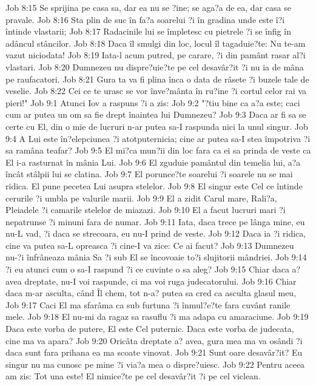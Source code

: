 Job 8:15  Se sprijina pe casa sa, dar ea nu se ?ine; se aga?a de ea, dar casa se pravale.
Job 8:16  Sta plin de suc în fa?a soarelui ?i în gradina unde este î?i întinde vlastarii;
Job 8:17  Radacinile lui se împletesc cu pietrele ?i se înfig în adâncul stâncilor.
Job 8:18  Daca îl smulgi din loc, locul îl tagaduie?te: Nu te-am vazut niciodata!
Job 8:19  Iata-l acum putred, pe carare, ?i din pamânt rasar al?i vlastari.
Job 8:20  Dumnezeu nu dispre?uie?te pe cel desavâr?it ?i nu ia de mâna pe raufacatori.
Job 8:21  Gura ta va fi plina înca o data de râsete ?i buzele tale de veselie.
Job 8:22  Cei ce te urasc se vor înve?mânta în ru?ine ?i cortul celor rai va pieri!"
Job 9:1  Atunci Iov a raspuns ?i a zis:
Job 9:2  "?tiu bine ca a?a este; caci cum ar putea un om sa fie drept înaintea lui Dumnezeu?
Job 9:3  Daca ar fi sa se certe cu El, din o mie de lucruri n-ar putea sa-I raspunda nici la unul singur.
Job 9:4  A Lui este în?elepciunea ?i atotputernicia; cine ar putea sa-I stea împotriva ?i sa ramâna teafar?
Job 9:5  El mi?ca mun?ii din loc fara ca ei sa prinda de veste ca El i-a rasturnat în mânia Lui.
Job 9:6  El zguduie pamântul din temelia lui, a?a încât stâlpii lui se clatina.
Job 9:7  El porunce?te soarelui ?i soarele nu se mai ridica. El pune pecetea Lui asupra stelelor.
Job 9:8  El singur este Cel ce întinde cerurile ?i umbla pe valurile marii.
Job 9:9  El a zidit Carul mare, Rali?a, Pleiadele ?i camarile stelelor de miazazi.
Job 9:10  El a facut lucruri mari ?i nepatrunse ?i minuni fara de numar.
Job 9:11  Iata, daca trece pe lânga mine, eu nu-L vad, ?i daca se strecoara, eu nu-I prind de veste.
Job 9:12  Daca ia ?i ridica, cine va putea sa-L opreasca ?i cine-I va zice: Ce ai facut?
Job 9:13  Dumnezeu nu-?i înfrâneaza mânia Sa ?i sub El se încovoaie to?i slujitorii mândriei.
Job 9:14  ?i eu atunci cum o sa-I raspund ?i ce cuvinte o sa aleg?
Job 9:15  Chiar daca a? avea dreptate, nu-I voi raspunde, ci ma voi ruga judecatorului.
Job 9:16  Chiar daca m-ar asculta, când Îl chem, tot n-a? putea sa cred ca asculta glasul meu,
Job 9:17  Caci El ma sfarâma ca sub furtuna ?i înmul?e?te fara cuvânt ranile mele.
Job 9:18  El nu-mi da ragaz sa rasuflu ?i ma adapa cu amaraciune.
Job 9:19  Daca este vorba de putere, El este Cel puternic. Daca este vorba de judecata, cine ma va apara?
Job 9:20  Oricâta dreptate a? avea, gura mea ma va osândi ?i daca sunt fara prihana ea ma scoate vinovat.
Job 9:21  Sunt oare desavâr?it? Eu singur nu ma cunosc pe mine ?i via?a mea o dispre?uiesc.
Job 9:22  Pentru aceea am zis: Tot una este! El nimice?te pe cel desavâr?it ?i pe cel viclean.
